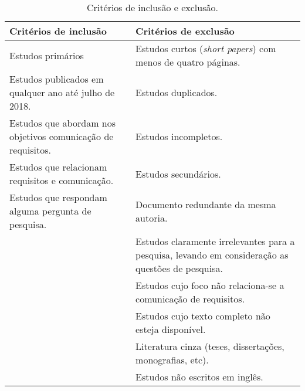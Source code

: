         \begin{table}[h!]
        \centering
        \caption{Critérios de inclusão e exclusão.}
        \label{tab:criterios}
        \footnotesize
        \begin{tabular}{p{6cm}p{6cm}}
        \hline
        \textbf{Critérios de inclusão}  & \textbf{Critérios de exclusão}   \\ \hline
        Estudos primários                               & Estudos curtos (\emph{short papers}) com menos de quatro páginas.       \\ \hline
        Estudos publicados em qualquer ano até julho de 2018. & Estudos duplicados. \\ \hline
        Estudos que abordam nos objetivos comunicação de requisitos.  &Estudos incompletos. \\\hline
        Estudos que relacionam requisitos e comunicação.  & Estudos secundários. \\\hline
        
        Estudos que respondam alguma pergunta de pesquisa.   & Documento redundante da mesma autoria.\\\hline
                                                         & Estudos claramente irrelevantes para a pesquisa, levando em consideração as questões de pesquisa.\\\hline
                                                         & Estudos cujo foco não relaciona-se a comunicação de requisitos.\\\hline
                                                         & Estudos cujo texto completo não esteja disponível.\\\hline
                                                         & Literatura cinza (teses, dissertações, monografias, etc).\\\hline
                                                         & Estudos não escritos em inglês.\\\hline
                                                        
        
        \end{tabular}
        \end{table}
